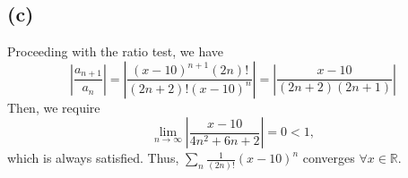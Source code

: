 \documentclass{article}
\newcommand{\R}{\mathbb{R}} %
\begin{document}
\subsection*{(c)}
Proceeding with the ratio test, we have
\begin{equation}
	\left|\frac{a_{n+1}}{a_n}\right| = \left|\frac{(x-10)^{n+1} (2n)!}{(2n+2)!(x-10)^n}\right| = \left|\frac{x-10}{(2n+2)(2n+1)}\right|
\end{equation}
Then, we require
\begin{equation}
	\lim_{n \to \infty} \left|\frac{x-10}{4n^2 + 6n + 2}\right| = 0 < 1,
\end{equation}
which is always satisfied. Thus, $\sum_n \frac{1}{(2n)!}(x-10)^n$ converges $\forall x \in \R$.
\end{document}
